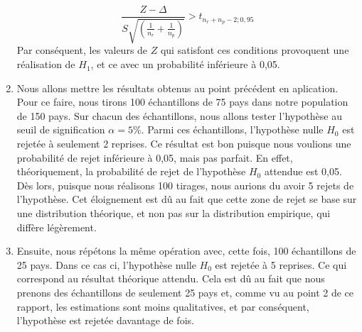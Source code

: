 \documentclass[a4paper, 11pt]{article}
\begin{document}
\begin{enumerate}[label=(\alph*)]
$$\frac{Z-\Delta}{S\sqrt{\left(\frac{1}{n_r}+\frac{1}{n_p}\right)}}>t_{n_r+n_p-2;0,95}$$
Par conséquent, les valeurs de $Z$ qui satisfont ces conditions provoquent une réalisation de $H_1$, et ce avec un probabilité inférieure à 0,05.
\item Nous allons mettre les résultats obtenus au point précédent en aplication. Pour ce faire, nous tirons 100 échantillons de 75 pays dans notre population de 150 pays. Sur chacun des échantillons, nous allons tester l'hypothèse au seuil de signification $\alpha=5\%$. Parmi ces échantillons, l'hypothèse nulle $H_0$ est rejetée à seulement 2 reprises. Ce résultat est bon puisque nous voulions une probabilité de rejet inférieure à 0,05, mais pas parfait. En effet, théoriquement, la probabilité de rejet de l'hypothèse $H_0$ attendue est 0,05. Dès lors, puisque nous réalisons 100 tirages, nous aurions du avoir 5 rejets de l'hypothèse. Cet éloignement est dû au fait que cette zone de rejet se base sur une distribution théorique, et non pas sur la distribution empirique, qui diffère légèrement.
\item Ensuite, nous répétons la même opération avec, cette fois, 100 échantillons de 25 pays. Dans ce cas ci, l'hypothèse nulle $H_0$ est rejetée à 5 reprises. Ce qui correspond au résultat théorique attendu. Cela est dû au fait que nous prenons des échantillons de seulement 25 pays et, comme vu au point 2 de ce rapport, les estimations sont moins qualitatives, et par conséquent, l'hypothèse est rejetée davantage de fois.
\end{enumerate}
\end{document}
